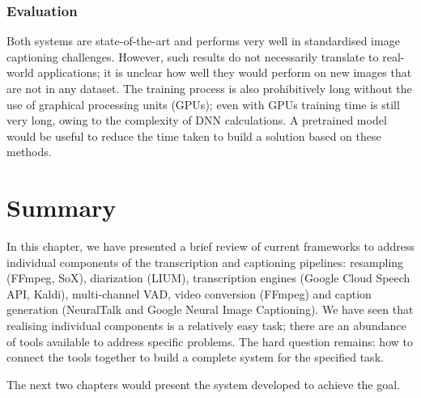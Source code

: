 \subsubsection{Evaluation}

Both systems are state-of-the-art and performs very well in standardised
image captioning challenges\cite{nrtalk,google-img}. However, such results do
not necessarily translate to real-world applications; it is unclear how well
they would perform on new images that are not in any dataset. The training
process is also prohibitively long without the use of graphical processing
units (GPUs); even with GPUs training time is still very long, owing to the 
complexity of DNN calculations. A pretrained model would be useful to reduce
the time taken to build a solution based on these methods.

\section{Summary}

In this chapter, we have presented a brief review of current frameworks to
address individual components of the transcription and captioning pipelines:
resampling (FFmpeg, SoX), diarization (LIUM), transcription engines (Google
Cloud Speech API, Kaldi), multi-channel VAD, video conversion (FFmpeg) and
caption generation (NeuralTalk and Google Neural Image Captioning). We have
seen that realising individual components is a relatively easy task; there
are an abundance of tools available to address specific problems. The hard
question remains: how to connect the tools together to build a complete
system for the specified task.

The next two chapters would present the system developed to achieve the
goal.
